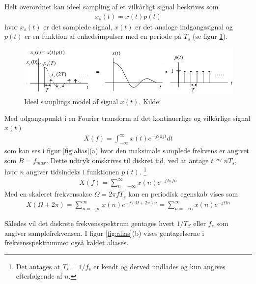 Helt overordnet kan ideel sampling af et vilkårligt signal beskrives som 
\begin{align}
x_s(t) = x(t)p(t)
\end{align}
hvor $x_s(t)$ er det samplede signal, $x(t)$ er det analoge indgangssignal og $p(t)$ er en funktion af enhedsimpulser med en periode på $T_s$ (se figur \ref{fig:sampling_signal}).
\begin{figure}[h!]
	\centering
	\includegraphics[width=.9\textwidth]{billeder/sampling.png}
	\caption{Ideel samplings model af signal $x(t)$. Kilde:\protect\cite[Figure 2.5 s.18 ]{Tan2013}}
	\label{fig:sampling_signal}
\end{figure}
Med udgangspunkt i en Fourier transform af det kontinuerlige og vilkårlige signal $x(t)$ 
\begin{align}
X(f) = \int_{-\infty}^{\infty}x(t)e^{-j2\pi f t}dt
\end{align}
som kan ses i figur \ref{fig:alias}(a) hvor den maksimale samplede frekvens er angivet som $B=f_{max}$.
Dette udtryk omskrives til diskret tid, ved at antage $t\curvearrowright nT_s$, hvor $n$ angiver tidsindeks i funktionen $p(t)$.
\footnote{Det antages at $T_s = 1/f_s$ er kendt og derved undlades og kun angives efterfølgende af $n$.}
\begin{align}
	X(f) = \sum_{n=-\infty}^{\infty}x(n)e^{-j2\pi f n}
\end{align}
Med en skaleret frekvensakse $\Omega = 2\pi f T_s$ kan en periodisk egenskab vises som
\begin{align}
	X(\Omega + 2\pi) = \sum_{n=-\infty}^{\infty}x(n)e^{-j(\Omega + 2\pi) n} = \sum_{n=-\infty}^{\infty}x(n)e^{-j\Omega n}
\end{align}

Således vil det diskrete frekvensspektrum gentages hvert $1/T_S$ eller $f_s$ som angiver samplefrekvensen.
I figur \ref{fig:alias}(b) vises gentagelserne i frekvensspektrummet også kaldet aliases.

